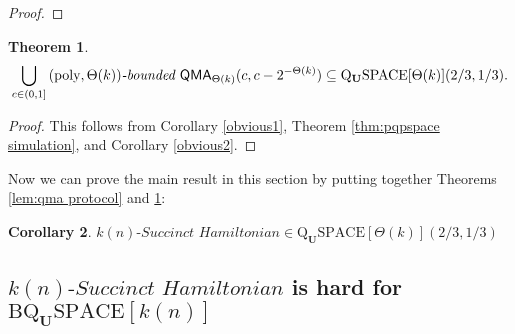 \documentclass[11pt]{article}
\newtheorem{theorem}{Theorem}
\newtheorem{corollary}[theorem]{Corollary}
\theoremstyle{definition}
\theoremstyle{remark}
\newcommand\QMA{{\sf{QMA}}}
\newcommand\bddQMA[5]{{\left(#1,#2\right)}\textit{-bounded }\QMA_{#3}(#4,#5)}
\newcommand\spechamiltonian[1]{#1\textit{-Succinct Hamiltonian}}
\newcommand{\classfont}{\mathrm}
\newcommand{\Unitary}{\mathbf{U}}
\newcommand{\unitaryQSPACE}[3]{\classfont{Q}_\Unitary\classfont{SPACE}[#1](#2,#3)}
\newcommand{\unitaryBQSPACE}[1]{\classfont{BQ}_\Unitary\classfont{SPACE}[#1]}
\newcommand{\poly}{\textrm{poly}}
\begin{document}
\begin{proof}
\end{proof}
\begin{theorem} \label{thm: pspace upper bound}
\[
\bigcup_{c \in (0,1]}\bddQMA{\poly}{\Theta(k)}{\Theta(k)}{c}{c-2^{-\Theta(k)}} \subseteq \unitaryQSPACE{\Theta(k)}{2/3}{1/3}.
\]
\end{theorem}
\begin{proof}
This follows from Corollary \ref{obvious1}, Theorem \ref{thm:pqpspace simulation}, and Corollary \ref{obvious2}.
\end{proof}

Now we can prove the main result in this section by putting together Theorems \ref{lem:qma protocol} and \ref{thm: pspace upper bound}:

\begin{corollary}\label{cor: specham-upper-bound}
$\spechamiltonian{k(n)}\in\unitaryQSPACE{\Theta(k)}{2/3}{1/3}$
\end{corollary}

\subsection{$\spechamiltonian{k(n)}$ is hard for $\unitaryBQSPACE{k(n)}$}
\end{document}

